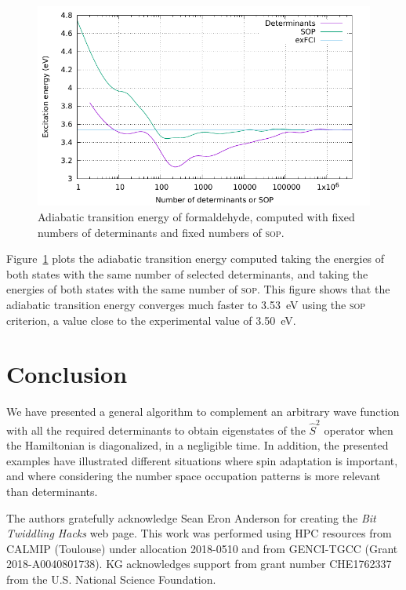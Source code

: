 \documentclass[aip,jcp,reprint,showkeys]{revtex4-1}
\newcommand{\stwo}{\hat{S}^2}
\newcommand{\sop}{\textsc{sop}}
\begin{document}
\begin{figure}
\includegraphics[width=0.9\columnwidth]{formaldehyde}
\caption{Adiabatic transition energy of formaldehyde, computed with fixed numbers of 
determinants and fixed numbers of \sop .}
\label{fig:formaldehyde}
\end{figure}

Figure~\ref{fig:formaldehyde} plots the adiabatic transition energy computed taking
the energies of both states with the same number of selected determinants, and taking
the energies of both states with the same number of \sop{}. This figure shows that
the adiabatic transition energy converges much faster to 3.53~eV using the
\sop{} criterion, a value close to the experimental value of
3.50~eV.\cite{Clouthier_1983,Angeli_2005}


\section{Conclusion}

We have presented a general algorithm to complement an arbitrary wave function
with all the required determinants to obtain eigenstates of the $\stwo$
operator when the Hamiltonian is diagonalized, in a negligible time. In
addition, the presented examples have illustrated different situations where
spin adaptation is important, and where considering the number space occupation
patterns is more relevant than determinants.


\begin{acknowledgments}
The authors gratefully acknowledge Sean Eron Anderson for creating the 
\emph{Bit Twiddling Hacks} web page.
This work was performed using HPC resources from CALMIP (Toulouse) under
allocation 2018-0510 and from GENCI-TGCC (Grant 2018-A0040801738).
KG acknowledges support from grant number CHE1762337 from the U.S. National Science Foundation.
\end{acknowledgments}



\end{document}

